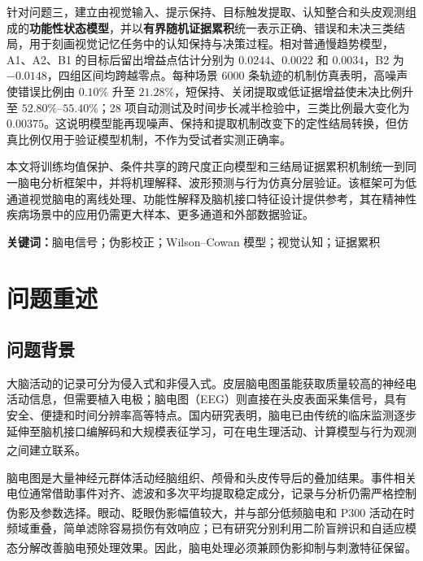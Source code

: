 \documentclass[a4paper,zihao=-4,linespread=1]{ctexart}
\numberwithin{figure}{section}       %
\newcommand{\upcite}[1]{\textsuperscript{\cite{#1}}} %
\begin{document}
针对问题三，建立由视觉输入、提示保持、目标触发提取、认知整合和头皮观测组成的\textbf{功能性状态模型}，并以\textbf{有界随机证据累积}统一表示正确、错误和未决三类结局，用于刻画视觉记忆任务中的认知保持与决策过程。相对普通慢趋势模型，A1、A2、B1 的目标后留出增益点估计分别为 $0.0244$、$0.0022$ 和 $0.0034$，B2 为 $-0.0148$，四组区间均跨越零点。每种场景 6000 条轨迹的机制仿真表明，高噪声使错误比例由 $0.10\%$ 升至 $21.28\%$，短保持、关闭提取或低证据增益使未决比例升至 $52.80\%$--$55.40\%$；28 项自动测试及时间步长减半检验中，三类比例最大变化为 $0.00375$。这说明模型能再现噪声、保持和提取机制改变下的定性结局转换，但仿真比例仅用于验证模型机制，不作为受试者实测正确率。


本文将训练均值保护、条件共享的跨尺度正向模型和三结局证据累积机制统一到同一脑电分析框架中，并将机理解释、波形预测与行为仿真分层验证。该框架可为低通道视觉脑电的离线处理、功能性解释及脑机接口特征设计提供参考，其在精神性疾病场景中的应用仍需更大样本、更多通道和外部数据验证。

\noindent\textbf{关键词：}脑电信号；伪影校正；Wilson--Cowan 模型；视觉认知；证据累积

\vspace{0.3cm}
\newpage

\begingroup
\setlength{\parskip}{0pt}
\tableofcontents
\endgroup
\newpage




\section{问题重述}
\subsection{问题背景}
大脑活动的记录可分为侵入式和非侵入式。皮层脑电图虽能获取质量较高的神经电活动信息，但需要植入电极；脑电图（EEG）则直接在头皮表面采集信号，具有安全、便捷和时间分辨率高等特点。国内研究表明，脑电已由传统的临床监测逐步延伸至脑机接口编解码和大规模表征学习，可在电生理活动、计算模型与行为观测之间建立联系\upcite{ding2024bci,qiu2023bci,he2025eegmodels}。

脑电图是大量神经元群体活动经脑组织、颅骨和头皮传导后的叠加结果。事件相关电位通常借助事件对齐、滤波和多次平均提取稳定成分，记录与分析仍需严格控制伪影及参数选择\upcite{picton2000guidelines,han2020eeg}。眼动、眨眼伪影幅值较大，并与部分低频脑电和 P300 活动在时频域重叠，简单滤除容易损伤有效响应；已有研究分别利用二阶盲辨识和自适应模态分解改善脑电预处理效果\upcite{yang2015sobi,zhang2026ssmd}。因此，脑电处理必须兼顾伪影抑制与刺激特征保留。
\end{document}
